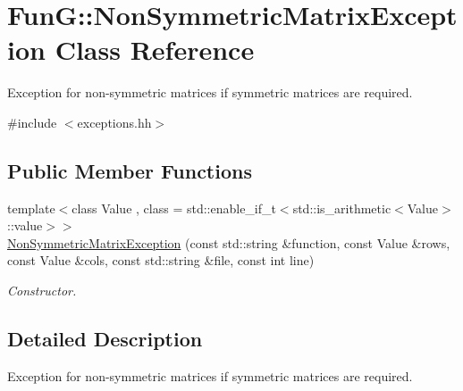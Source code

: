 \hypertarget{classFunG_1_1NonSymmetricMatrixException}{\section{\-Fun\-G\-:\-:\-Non\-Symmetric\-Matrix\-Exception \-Class \-Reference}
\label{classFunG_1_1NonSymmetricMatrixException}
}


\-Exception for non-\/symmetric matrices if symmetric matrices are required.  




{\ttfamily \#include $<$exceptions.\-hh$>$}

\subsection*{\-Public \-Member \-Functions}
\begin{DoxyCompactItemize}
\item 
{\footnotesize template$<$class Value , class  = std\-::enable\-\_\-if\-\_\-t$<$std\-::is\-\_\-arithmetic$<$\-Value$>$\-::value$>$$>$ }\\\hyperlink{classFunG_1_1NonSymmetricMatrixException_a1c11fd643c37e5fa2145aba2cc7ab09d}{\-Non\-Symmetric\-Matrix\-Exception} (const std\-::string \&function, const \-Value \&rows, const \-Value \&cols, const std\-::string \&file, const int line)
\begin{DoxyCompactList}\small\item\em \-Constructor. \end{DoxyCompactList}\end{DoxyCompactItemize}


\subsection{\-Detailed \-Description}
\-Exception for non-\/symmetric matrices if symmetric matrices are required. 

